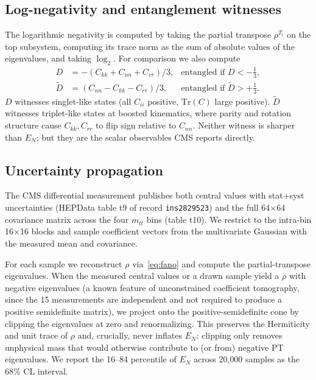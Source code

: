 \documentclass[11pt,a4paper]{article}
\theoremstyle{definition}
\begin{document}
\subsection{Log-negativity and entanglement witnesses}

The logarithmic negativity is computed by taking the partial transpose $\rho^{T_t}$ on the top subsystem, computing its trace norm as the sum of absolute values of the eigenvalues, and taking $\log_2$. For comparison we also compute
\begin{align}
D &= -(C_{kk} + C_{nn} + C_{rr})/3, & \text{entangled if } D < -\tfrac{1}{3}, \\
\tilde{D} &= (C_{nn} - C_{kk} - C_{rr})/3, & \text{entangled if } \tilde{D} > +\tfrac{1}{3}.
\end{align}
$D$ witnesses singlet-like states (all $C_{ii}$ positive, $\text{Tr}(C)$ large positive). $\tilde{D}$ witnesses triplet-like states at boosted kinematics, where parity and rotation structure cause $C_{kk}, C_{rr}$ to flip sign relative to $C_{nn}$. Neither witness is sharper than $E_N$; but they are the scalar observables CMS reports directly.

\subsection{Uncertainty propagation}\label{sec:uncertainty}

The CMS differential measurement publishes both central values with stat+syst uncertainties (HEPData table t9 of record \texttt{ins2829523}) and the full 64$\times$64 covariance matrix across the four $m_{t\bar{t}}$ bins (table t10). We restrict to the intra-bin 16$\times$16 blocks and sample coefficient vectors from the multivariate Gaussian with the measured mean and covariance.

For each sample we reconstruct $\rho$ via~\eqref{eq:fano} and compute the partial-transpose eigenvalues. When the measured central values or a drawn sample yield a $\rho$ with negative eigenvalues (a known feature of unconstrained coefficient tomography, since the 15 measurements are independent and not required to produce a positive semidefinite matrix), we project onto the positive-semidefinite cone by clipping the eigenvalues at zero and renormalizing. This preserves the Hermiticity and unit trace of $\rho$ and, crucially, never inflates $E_N$: clipping only removes unphysical mass that would otherwise contribute to (or from) negative PT eigenvalues. We report the 16--84 percentile of $E_N$ across 20{,}000 samples as the 68\% CL interval.
\end{document}
